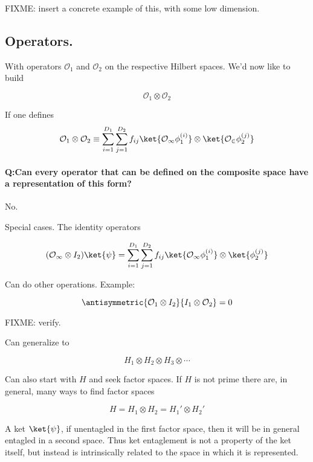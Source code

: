 FIXME: insert a concrete example of this, with some low dimension.

\subsection{Operators.}

With operators $\mathcal{O}_1$ and $\mathcal{O}_2$ on the respective Hilbert spaces.  We'd now like to build 

\begin{equation}\label{eqn:qmTwoL1:n}
\mathcal{O}_1 \otimes \mathcal{O}_2
\end{equation}

If one defines
\begin{equation}\label{eqn:qmTwoL1:n}
\mathcal{O}_1 \otimes \mathcal{O}_2
\equiv
\sum_{i = 1}^{D_1}
\sum_{j = 1}^{D_2}
f_{ij}
\ket{ \mathcal{O_1} \phi_1^{(i)}} \otimes \ket{ \mathcal{O_2} \phi_2^{(j)}} 
\end{equation}

\paragraph{Q:Can every operator that can be defined on the composite space have a representation of this form?}

No.

Special cases.  The identity operators

\begin{equation}\label{eqn:qmTwoL1:n}
(\mathcal{O_1} \otimes I_2) \ket{\psi}
=
\sum_{i = 1}^{D_1}
\sum_{j = 1}^{D_2}
f_{ij}
\ket{ \mathcal{O_1} \phi_1^{(i)}} \otimes \ket{ \phi_2^{(j)}} 
\end{equation}

Can do other operations.  Example:

\begin{equation}\label{eqn:qmTwoL1:n}
\antisymmetric{ \mathcal{O}_1 \otimes I_2 }{ I_1 \otimes \mathcal{O}_2 } = 0
\end{equation}

FIXME: verify.

Can generalize to 

\begin{equation}\label{eqn:qmTwoL1:n}
H_1 \otimes H_2 \otimes H_3 \otimes \cdots
\end{equation}

Can also start with $H$ and seek factor spaces.  If $H$ is not prime there are, in general, many ways to find factor spaces

\begin{equation}\label{eqn:qmTwoL1:n}
H = 
H_1 \otimes H_2 =
H_1' \otimes H_2'
\end{equation}

A ket $\ket{\psi}$, if unentagled in the first factor space, then it will be in general entagled in a second space.  Thus ket entaglement is not a property of the ket itself, but instead is intrinsically related to the space in which it is represented.

\EndNoBibArticle
